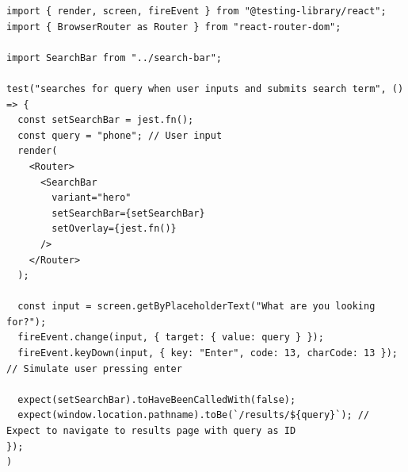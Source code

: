 \documentclass[article]{IEEEtran}
\begin{document}
            \begin{lstlisting}[style=jsListingStyle, caption={Search functionality test}, captionpos=t]
import { render, screen, fireEvent } from "@testing-library/react";
import { BrowserRouter as Router } from "react-router-dom";

import SearchBar from "../search-bar";

test("searches for query when user inputs and submits search term", () => {
  const setSearchBar = jest.fn();
  const query = "phone"; // User input
  render(
    <Router>
      <SearchBar
        variant="hero"
        setSearchBar={setSearchBar}
        setOverlay={jest.fn()}
      />
    </Router>
  );

  const input = screen.getByPlaceholderText("What are you looking for?");
  fireEvent.change(input, { target: { value: query } });
  fireEvent.keyDown(input, { key: "Enter", code: 13, charCode: 13 }); // Simulate user pressing enter

  expect(setSearchBar).toHaveBeenCalledWith(false);
  expect(window.location.pathname).toBe(`/results/${query}`); // Expect to navigate to results page with query as ID
});
) \end{lstlisting}
\end{document}
